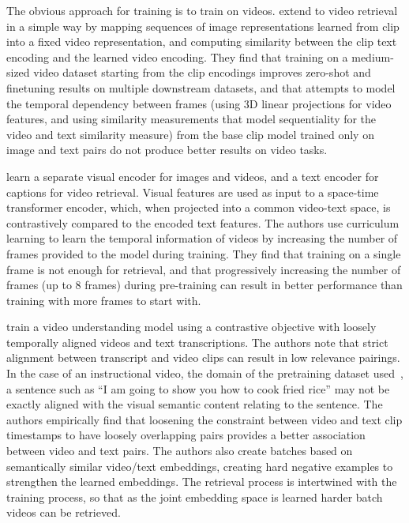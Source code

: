 The obvious approach for training  is to train on videos.
\citet{luo2022clip4clip} extend  to video retrieval in a simple
way by mapping sequences of image representations learned from \acrshort{clip}
into a fixed video representation, and computing similarity between the
\acrshort{clip} text encoding and the learned video encoding. They find that
training on a medium-sized video dataset starting from the \acrshort{clip}
encodings improves zero-shot and finetuning results on multiple downstream
datasets, and that attempts to model the temporal dependency between frames
(using 3D linear projections for video features, and using similarity
measurements that model sequentiality for the video and text similarity
measure) from the base \acrshort{clip} model trained only on image and text
pairs do not produce better results on video tasks.

\citet{bain2021frozen} learn a separate visual encoder for images and videos,
and a text encoder for captions for video retrieval. Visual features are used
as input to a space-time transformer encoder, which, when projected into a
common video-text space, is contrastively compared to the encoded text
features. The authors use curriculum learning to learn the temporal information
of videos by increasing the number of frames provided to the model during
training. They find that training on a single frame is not enough for
retrieval, and that progressively increasing the number of frames (up to 8
frames) during pre-training can result in better performance than training with
more frames to start with. 

\cite{xu2021videoclip} train a video understanding model using a contrastive
objective with loosely temporally aligned videos and text transcriptions. The
authors note that strict alignment between transcript and video clips can
result in low relevance pairings. In the case of an instructional video, the
domain of the pretraining dataset used~\citep{miech2019howto100m}, a sentence
such as ``I am going to show you how to cook fried rice'' may not be exactly
aligned with the visual semantic content relating to the sentence. The authors
empirically find that loosening the constraint between video and text clip
timestamps to have loosely overlapping pairs provides a better association
between video and text pairs. The authors also create batches based on
semantically similar video/text embeddings, creating hard negative examples
to strengthen the learned embeddings. The retrieval process is intertwined
with the training process, so that as the joint embedding space is learned
harder batch videos can be retrieved.


